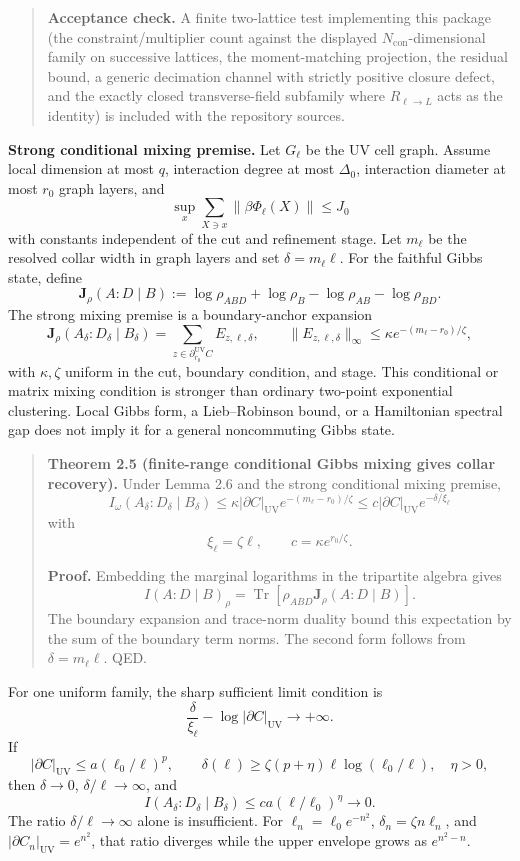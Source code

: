 \begin{quote}
\textbf{Acceptance check.} A finite two-lattice test implementing this package (the constraint/multiplier count against the displayed \(N_{\mathrm{con}}\)-dimensional family on successive lattices, the moment-matching projection, the residual bound, a generic decimation channel with strictly positive closure defect, and the exactly closed transverse-field subfamily where \(R_{\ell\to L}\) acts as the identity) is included with the repository sources.
\end{quote}

\textbf{Strong conditional mixing premise.} Let \(G_\ell\) be the UV cell graph. Assume local
dimension at most \(q\), interaction degree at most \(\Delta_0\), interaction diameter at most
\(r_0\) graph layers, and
\[
\sup_x\sum_{X\ni x}\|\beta\Phi_\ell(X)\|\le J_0
\]
with constants independent of the cut and refinement stage. Let \(m_\ell\) be the
resolved collar width in graph layers and set \(\delta=m_\ell\ell\). For the faithful Gibbs state, define
\[
\mathbf J_\rho(A:D\mid B)
:=\log\rho_{ABD}+\log\rho_B-\log\rho_{AB}-\log\rho_{BD}.
\]
The strong mixing premise is a boundary-anchor expansion
\[
\mathbf J_\rho(A_\delta:D_\delta\mid B_\delta)
=\sum_{z\in\partial^{\mathrm{UV}}_{r_0}C}E_{z,\ell,\delta},
\qquad
\|E_{z,\ell,\delta}\|_\infty
\le\kappa e^{-(m_\ell-r_0)/\zeta},
\]
with \(\kappa,\zeta\) uniform in the cut, boundary condition, and stage. This conditional or
matrix mixing condition is stronger than ordinary two-point exponential clustering. Local Gibbs
form, a Lieb--Robinson bound, or a Hamiltonian spectral gap does not imply it for a general
noncommuting Gibbs state.

\begin{quote}
\textbf{Theorem 2.5 (finite-range conditional Gibbs mixing gives collar recovery).}
Under Lemma 2.6 and the strong conditional mixing premise,
\[
\boxed{
I_\omega(A_\delta:D_\delta\mid B_\delta)
\le
\kappa|\partial C|_{\mathrm{UV}}e^{-(m_\ell-r_0)/\zeta}
\le
c|\partial C|_{\mathrm{UV}}e^{-\delta/\xi_\ell}}
\]
with
\[
\xi_\ell=\zeta\ell,
\qquad
c=\kappa e^{r_0/\zeta}.
\]

\textbf{Proof.} Embedding the marginal logarithms in the tripartite algebra gives
\[
I(A:D\mid B)_\rho
=\operatorname{Tr}\!\left[\rho_{ABD}\mathbf J_\rho(A:D\mid B)\right].
\]
The boundary expansion and trace-norm duality bound this expectation by the sum of the boundary
term norms. The second form follows from \(\delta=m_\ell\ell\). QED.
\end{quote}

For one uniform family, the sharp sufficient limit condition is
\[
\frac{\delta}{\xi_\ell}-\log|\partial C|_{\mathrm{UV}}\longrightarrow+\infty.
\]
If
\[
|\partial C|_{\mathrm{UV}}\le a(\ell_0/\ell)^p,
\qquad
\delta(\ell)\ge\zeta(p+\eta)\ell\log(\ell_0/\ell),
\quad \eta>0,
\]
then \(\delta\to0\), \(\delta/\ell\to\infty\), and
\[
I(A_\delta:D_\delta\mid B_\delta)
\le ca(\ell/\ell_0)^\eta\longrightarrow0.
\]
The ratio \(\delta/\ell\to\infty\) alone is insufficient. For
\(\ell_n=\ell_0e^{-n^2}\), \(\delta_n=\zeta n\ell_n\), and
\(|\partial C_n|_{\mathrm{UV}}=e^{n^2}\), that ratio diverges while the upper envelope grows as
\(e^{n^2-n}\).

